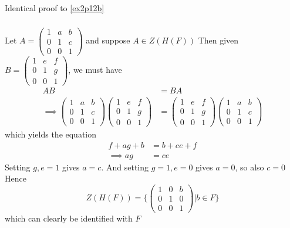 \documentclass{article}
\newcommand{\set}[1]{ \{ #1 \} }
\begin{document}
\subsubsection{}\label{ex2p13}
Identical proof to \ref{ex2p12b}
\subsubsection{}\label{ex2p14}
Let $A = \begin{pmatrix}1 & a & b\\ 0 & 1 & c\\ 0 & 0 & 1\end{pmatrix}$ and suppose $A \in Z(H(F))$ Then given $B = \begin{pmatrix}1 & e & f\\
0 & 1 & g\\
0 & 0 & 1\end{pmatrix}$, we must have
\begin{align*}
AB &= BA\\
\implies \begin{pmatrix}1 & a & b\\0 & 1 & c\\0 & 0 & 1\end{pmatrix}\begin{pmatrix}1 & e & f\\0 & 1 & g\\0 & 0 & 1\end{pmatrix} &= \begin{pmatrix}1 & e & f\\0 & 1 & g\\0 & 0 & 1\end{pmatrix}\begin{pmatrix}1 & a & b\\0 & 1 & c\\0 & 0 & 1\end{pmatrix}
\end{align*}
which yields the equation
\begin{align*}
f+ag+b&=b+ce+f\\
\implies ag&=ce
\end{align*}
Setting $g,e=1$ gives $a=c$. And setting $g=1,e=0$ gives $a=0$, so also $c=0$\\
Hence
\begin{equation}
Z(H(F)) = \set{ \begin{pmatrix}1 & 0 & b\\0 & 1 & 0\\0 & 0 & 1\end{pmatrix} | b \in F }
\end{equation}
which can clearly be identified with $F$
\end{document}
